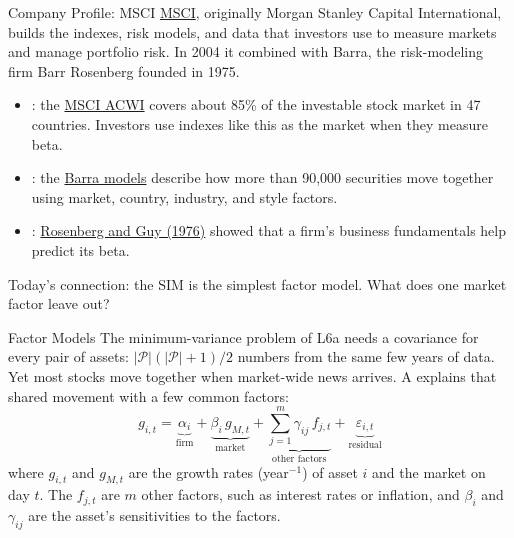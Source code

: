 \documentclass[aspectratio=169,11pt]{beamer}
\newcommand{\np}{|\mathcal{P}|}
\begin{document}
\begin{frame}{Company Profile: MSCI}
  \href{https://www.msci.com/discover-msci/about-us}{MSCI}, originally Morgan
  Stanley Capital International, builds the indexes, risk models, and data that
  investors use to measure markets and manage portfolio risk. In 2004 it
  combined with Barra, the risk-modeling firm Barr Rosenberg founded in 1975.

  \vspace{0.2em}
  \begin{itemize}\setlength{\itemsep}{0.4em}
    \item {}: the
      \href{https://www.msci.com/indexes/index/892400}{MSCI ACWI} covers about 85\%
      of the investable stock market in 47 countries. Investors use indexes like
      this as the market when they measure beta.
    \item {}: the
      \href{https://www.msci.com/data-and-analytics/factor-investing/equity-factor-models}{Barra models}
      describe how more than 90,000 securities move together using market,
      country, industry, and style factors.
    \item {}:
      \href{https://doi.org/10.2469/faj.v32.n3.60}{Rosenberg and Guy (1976)} showed
      that a firm's business fundamentals help predict its beta.
  \end{itemize}

  \vspace{0.4em}
  Today's connection: the SIM is the simplest factor model. What does one
  market factor leave out?
\end{frame}

\begin{frame}{Factor Models}
  The minimum-variance problem of L6a needs a covariance for every pair of
  assets: $\np(\np+1)/2$ numbers from the same few years of data. Yet most
  stocks move together when market-wide news arrives. A 
  explains that shared movement with a few common factors:
  \[
    g_{i,t}=\underbrace{\alpha_i}_{\text{firm}}
      +\underbrace{\beta_i\,g_{M,t}}_{\text{market}}
      +\underbrace{\sum_{j=1}^{m}\gamma_{ij}\,f_{j,t}}_{\text{other factors}}
      +\underbrace{\varepsilon_{i,t}}_{\text{residual}}
  \]
  where $g_{i,t}$ and $g_{M,t}$ are the growth rates (year$^{-1}$) of asset $i$
  and the market on day $t$. The $f_{j,t}$ are $m$ other factors, such as
  interest rates or inflation, and $\beta_i$ and $\gamma_{ij}$ are the asset's
  sensitivities to the factors.
\end{frame}
\end{document}

